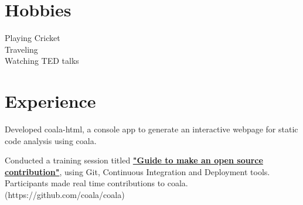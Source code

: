 \documentclass[]{deedy-resume-openfont}
\begin{document}
\begin{minipage}[t]{0.33\textwidth}
\section{Hobbies} 
\textbullet{} Playing Cricket \\
\textbullet{} Traveling \\
\textbullet{} Watching TED talks \\
\sectionsep

%
%

\end{minipage} 
\hfill
\begin{minipage}[t]{0.66\textwidth} 


\section{Experience}

\vspace{\topsep} 
\begin{tightemize}
\item Developed coala-html, a console app to generate an interactive webpage for static code analysis using coala. \textbf{\href{https://github.com/coala/coala-html}{ }} \end{tightemize}
\sectionsep

\vspace{\topsep} 
\begin{tightemize}
\item Conducted a training session titled \textbf{\href{https://ep2016.europython.eu/conference/talks/guid-to-make-a-real-contribution-to-an-open-source-project-for-novice}{"Guide to make an open source contribution"}}, using Git, Continuous Integration and Deployment tools. Participants made real time contributions to coala. (https://github.com/coala/coala)
\end{tightemize}
\sectionsep


\end{minipage}
\end{document}
